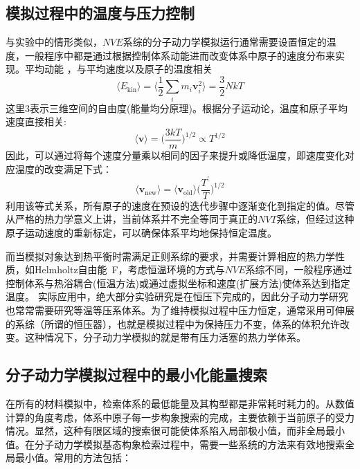 \subsection{模拟过程中的温度与压力控制}
与实验中的情形类似，$NVE$系综的分子动力学模拟运行通常需要设置恒定的温度，一般程序中都是通过根据控制体系动能进而改变体系中原子的速度分布来实现。平均动能 ，与平均速度以及原子的温度相关
\begin{equation}
	\langle E_{\mathrm{kin}}\rangle=\bigg\langle\dfrac12\sum_im_i\mathbf{v}_i^2\bigg\rangle=\dfrac32NkT
	\label{eq:MD_molecular_kinetic}
\end{equation}
这里3表示三维空间的自由度(能量均分原理)。根据分子运动论，温度和原子平均速度直接相关:
\begin{displaymath}
	\langle\mathbf{v}\rangle=\bigg(\dfrac{3kT}m\bigg)^{1/2}\propto T^{1/2}
\end{displaymath} 
因此，可以通过将每个速度分量乘以相同的因子来提升或降低温度，即速度变化对应温度的改变满足下式：
\begin{equation}
	\langle\mathbf{v}_{\mathrm{new}}\rangle=\langle\mathbf{v}_{\mathrm{old}}\rangle\bigg(\dfrac{T^{\prime}}T\bigg)^{1/2}
	\label{eq:MD_velocity_relation}
\end{equation}
利用该等式关系，所有原子的速度在预设的迭代步骤中逐渐变化到指定的值。尽管从严格的热力学意义上讲，当前体系并不完全等同于真正的$NVT$系综，但经过这种原子运动速度的重新标定，可以确保体系平均地保持恒定温度。

而当模拟对象达到热平衡时需满足正则系综的要求，并需要计算相应的热力学性质，如\textrm{Helmholtz}自由能~\textrm{F}，考虑恒温环境的方式与$NVE$系综不同，一般程序通过控制体系与热浴耦合(恒温方法)或通过虚拟坐标和速度(扩展方法)使体系达到指定温度。
实际应用中，绝大部分实验研究是在恒压下完成的，因此分子动力学研究也常常需要研究等温等压系体系。为了维持模拟过程中压力恒定，通常采用可伸展的系综（所谓的恒压器），也就是模拟过程中为保持压力不变，体系的体积允许改变。这种情况下，分子动力学模拟的就是带有压力活塞的热力学体系。
\subsection{分子动力学模拟过程中的最小化能量搜索}
在所有的材料模拟中，检索体系的最低能量及其构型都是非常耗时耗力的。从数值计算的角度考虑，体系中原子每一步构象搜索的完成，主要依赖于当前原子的受力情况。显然，这种有限区域的搜索很可能使体系陷入局部极小值，而非全局最小值。在分子动力学模拟基态构象检索过程中，需要一些系统的方法来有效地搜索全局最小值。常用的方法包括：
